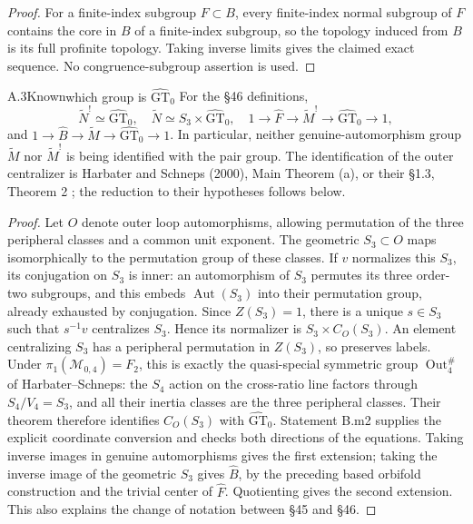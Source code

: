 \begin{proof}
For a finite-index subgroup $F\subset B$, every finite-index normal subgroup of $F$ contains the core in $B$ of a finite-index subgroup, so the topology induced from $B$ is its full profinite topology. Taking inverse limits gives the claimed exact sequence. No congruence-subgroup assertion is used.
\end{proof}

\begin{claim}{A.3}{Known}{which group is $\widehat{\mathrm{GT}}_0$}
For the \S46 definitions,
\[
 \widetilde N^!\simeq\widehat{\mathrm{GT}}_0,\quad
 \widetilde N\simeq S_3\times\widehat{\mathrm{GT}}_0,\quad
 1\to\widehat F\to\widetilde M^!\to\widehat{\mathrm{GT}}_0\to1,
\]
and $1\to\widehat B\to\widetilde M\to\widehat{\mathrm{GT}}_0\to1$.
In particular, neither genuine-automorphism group $\widetilde M$ nor $\widetilde M^!$ is being identified with the pair group. The identification of the outer centralizer is Harbater and Schneps (2000), Main Theorem (a), or their \S1.3, Theorem 2 \citep{HS2000}; the reduction to their hypotheses follows below.

\end{claim}

\begin{proof}
Let $O$ denote outer loop automorphisms, allowing permutation of the three peripheral classes and a common unit exponent. The geometric $S_3\subset O$ maps isomorphically to the permutation group of these classes. If $v$ normalizes this $S_3$, its conjugation on $S_3$ is inner: an automorphism of $S_3$ permutes its three order-two subgroups, and this embeds $\operatorname{Aut}(S_3)$ into their permutation group, already exhausted by conjugation. Since $Z(S_3)=1$, there is a unique $s\in S_3$ such that $s^{-1}v$ centralizes $S_3$. Hence its normalizer is $S_3\times C_O(S_3)$. An element centralizing $S_3$ has a peripheral permutation in $Z(S_3)$, so preserves labels. Under $\pi_1(\mathcal M_{0,4})=F_2$, this is exactly the quasi-special symmetric group $\operatorname{Out}^{\#}_4$ of Harbater--Schneps: the $S_4$ action on the cross-ratio line factors through $S_4/V_4=S_3$, and all their inertia classes are the three peripheral classes. Their theorem therefore identifies $C_O(S_3)$ with $\widehat{\mathrm{GT}}_0$. Statement B.m2 supplies the explicit coordinate conversion and checks both directions of the equations. Taking inverse images in genuine automorphisms gives the first extension; taking the inverse image of the geometric $S_3$ gives $\widehat B$, by the preceding based orbifold construction and the trivial center of $\widehat F$. Quotienting gives the second extension. This also explains the change of notation between \S45 and \S46.
\end{proof}

